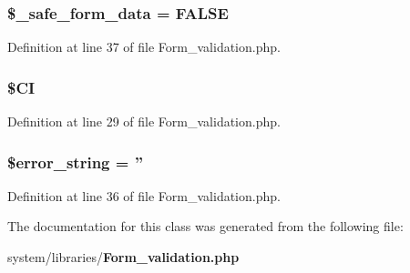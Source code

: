 \subsubsection[{\$\-\_\-safe\-\_\-form\-\_\-data}]{\setlength{\rightskip}{0pt plus 5cm}\$\-\_\-safe\-\_\-form\-\_\-data = F\-A\-L\-S\-E\hspace{0.3cm}{\ttfamily [protected]}}\label{class_c_i___form__validation_ad767d36cd2cc57999044f0a94a0e470f}


Definition at line 37 of file Form\-\_\-validation.\-php.

\subsubsection[{\$\-C\-I}]{\setlength{\rightskip}{0pt plus 5cm}\$C\-I\hspace{0.3cm}{\ttfamily [protected]}}\label{class_c_i___form__validation_ae0314d046ddf7fcfaec03222977427d3}


Definition at line 29 of file Form\-\_\-validation.\-php.

\subsubsection[{\$error\-\_\-string}]{\setlength{\rightskip}{0pt plus 5cm}\${\bf error\-\_\-string} = ''\hspace{0.3cm}{\ttfamily [protected]}}\label{class_c_i___form__validation_a22323b47b58139586ed855d04138d212}


Definition at line 36 of file Form\-\_\-validation.\-php.



The documentation for this class was generated from the following file\-:\begin{DoxyCompactItemize}
\item 
system/libraries/{\bf Form\-\_\-validation.\-php}\end{DoxyCompactItemize}

